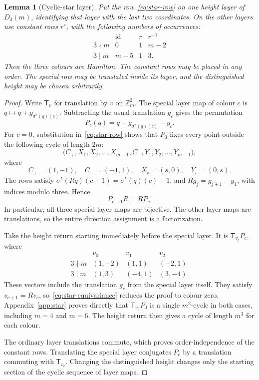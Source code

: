 \documentclass[11pt,reqno]{amsart}
\numberwithin{equation}{section}
\newtheorem{lemma}[theorem]{Lemma}
\theoremstyle{definition}
\theoremstyle{remark}
\newcommand{\Zm}{\mathbb Z_m}
\newcommand{\id}{\operatorname{id}}
\newcommand{\tr}{\mathsf T}
\begin{document}
\begin{lemma}[Cyclic-star layer]\label{lem:star}
Put the row~\eqref{eq:star-row} on one height layer of $D_3(m)$, identifying that
layer with the last two coordinates. On the other layers use constant rows
$r^s$, with the following numbers of occurrences:
\begin{equation}\label{eq:star-counts}
\begin{array}{c|ccc}
 & \id&r&r^{-1}\\\hline
3\nmid m&0&1&m-2\\
3\mid m&m-5&1&3.
\end{array}
\end{equation}
Then the three colours are Hamilton. The constant rows may be placed in any
order. The special row may be translated inside its layer, and the distinguished
height may be chosen arbitrarily.
\end{lemma}
\begin{proof}
Write $\tr_v$ for translation by $v$ on $\Zm^2$. The special layer map of colour
$c$ is $q\mapsto q+g_{\sigma^*(q)(c)}$. Subtracting the usual translation $g_c$
gives the permutation
\[
 P_c(q)=q+g_{\sigma^*(q)(c)}-g_c.
\]
For $c=0$, substitution in~\eqref{eq:star-row} shows that $P_0$ fixes every point
outside the following cycle of length $2m$:
\begin{equation}\label{eq:star-support}
 \bigl(C_+,X_1,X_2,\ldots,X_{m-1},C_-,Y_1,Y_2,\ldots,Y_{m-1}\bigr),
\end{equation}
where
\[
 C_+=(1,-1),\quad C_-=(-1,1),\quad X_s=(s,0),\quad Y_s=(0,s).
\]
The rows satisfy
$\sigma^*(Rq)(c+1)=\sigma^*(q)(c)+1$, and
$Rg_j=g_{j+1}-g_1$, with indices modulo three. Hence
\begin{equation}\label{eq:star-equivariance}
 P_{c+1}R=RP_c.
\end{equation}
In particular, all three special layer maps are bijective. The other layer maps
are translations, so the entire direction assignment is a factorization.

Take the height return starting immediately before the special layer. It is
$\tr_{v_c}P_c$, where
\begin{equation}\label{eq:star-voltage}
\begin{array}{c|ccc}
 &v_0&v_1&v_2\\\hline
3\nmid m&(1,-2)&(1,1)&(-2,1)\\
3\mid m&(1,3)&(-4,1)&(3,-4).
\end{array}
\end{equation}
These vectors include the translation $g_c$ from the special layer itself.
They satisfy $v_{c+1}=Rv_c$, so~\eqref{eq:star-equivariance} reduces the proof to
colour zero. Appendix~\ref{app:star} proves directly that $\tr_{v_0}P_0$ is a
single $m^2$-cycle in both cases, including $m=4$ and $m=6$. The height return
then gives a cycle of length $m^3$ for each colour.

The ordinary layer translations commute, which proves order-independence of the
constant rows. Translating the special layer conjugates $P_c$ by a translation
commuting with $\tr_{v_c}$. Changing the distinguished height changes only the
starting section of the cyclic sequence of layer maps.
\end{proof}
\end{document}
